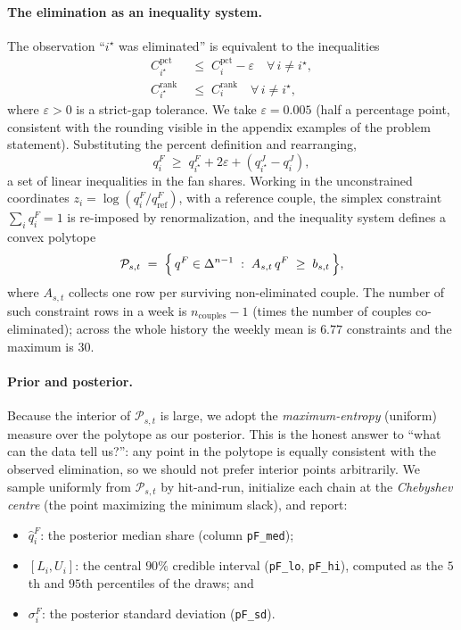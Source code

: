 \documentclass{article}
\begin{document}
\paragraph{The elimination as an inequality system.} The observation ``$i^{\star}$ was
eliminated'' is equivalent to the inequalities
\begin{align}
C^{\text{pct}}_{i^{\star}} &\;\le\; C^{\text{pct}}_{i} - \varepsilon \quad \forall\, i\neq i^{\star}, \label{eq:pctcon}\\
C^{\text{rank}}_{i^{\star}} &\;\le\; C^{\text{rank}}_{i} \quad \forall\, i\neq i^{\star}, \label{eq:rankcon}
\end{align}
where $\varepsilon>0$ is a strict-gap tolerance. We take $\varepsilon=0.005$ (half a
percentage point, consistent with the rounding visible in the appendix examples of the
problem statement). Substituting the percent definition and rearranging,
\begin{equation}
q^{F}_{i} \;\ge\; q^{F}_{i^{\star}} + 2\varepsilon + (q^{J}_{i^{\star}}-q^{J}_{i}),
\end{equation}
a set of linear inequalities in the fan shares. Working in the unconstrained coordinates
$z_{i}=\log(q^{F}_{i}/q^{F}_{\text{ref}})$, with a reference couple, the simplex constraint
$\sum_i q^{F}_i=1$ is re-imposed by renormalization, and the inequality system defines a
convex polytope
\begin{equation}
\mathcal{P}_{s,t} \;=\; \Bigl\{\, q^{F}\in\Delta^{n-1} \;:\; A_{s,t}\, q^{F} \;\ge\; b_{s,t} \,\Bigr\},
\end{equation}
where $A_{s,t}$ collects one row per surviving non-eliminated couple. The number of such
constraint rows in a week is $n_{\text{couples}}-1$ (times the number of couples
co-eliminated); across the whole history the weekly mean is $6.77$ constraints and the
maximum is $30$.

\paragraph{Prior and posterior.} Because the interior of $\mathcal{P}_{s,t}$ is large, we
adopt the \emph{maximum-entropy} (uniform) measure over the polytope as our posterior. This
is the honest answer to ``what can the data tell us?'': any point in the polytope is
equally consistent with the observed elimination, so we should not prefer interior points
arbitrarily. We sample uniformly from $\mathcal{P}_{s,t}$ by hit-and-run, initialize each
chain at the \emph{Chebyshev centre} (the point maximizing the minimum slack), and report:
\begin{itemize}
\item $\hat q^{F}_{i}$: the posterior median share (column \texttt{pF\_med});
\item $[L_{i}, U_{i}]$: the central $90\%$ credible interval (\texttt{pF\_lo},
\texttt{pF\_hi}), computed as the $5$th and $95$th percentiles of the draws; and
\item $\sigma^{F}_{i}$: the posterior standard deviation (\texttt{pF\_sd}).
\end{itemize}
\end{document}
